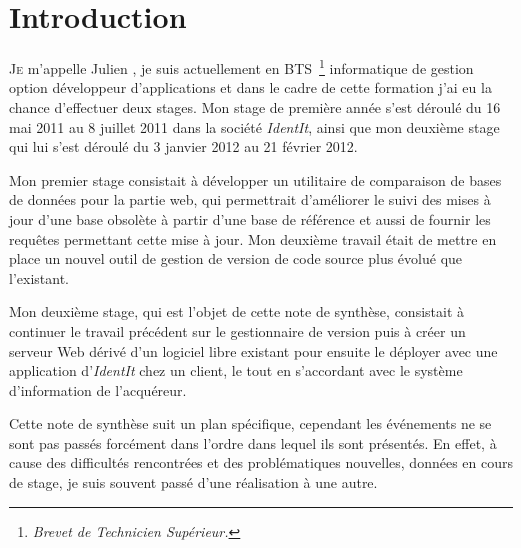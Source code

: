 \chapter{Introduction} %
\label{cha:Introduction}

\lettrine{J}{e} m'appelle Julien , je suis actuellement en
BTS\, \footnote{\emph{Brevet de Technicien Supérieur.}} informatique de
gestion option développeur d'applications et dans le cadre de cette
formation j'ai eu la chance d'effectuer deux stages. Mon stage de
première année s'est déroulé du 16 mai 2011 au 8 juillet 2011 dans la
société \emph{IdentIt}, ainsi que mon deuxième stage qui lui s'est
déroulé du 3 janvier 2012 au 21 février 2012.

Mon premier stage consistait à développer un utilitaire de comparaison
de bases de données pour la partie web, qui permettrait d'améliorer le
suivi des mises à jour d'une base obsolète à partir d'une base de
référence et aussi de fournir les requêtes permettant cette mise à jour.
Mon deuxième travail était de mettre en place un nouvel outil de gestion
de version de code source plus évolué que l'existant.

Mon deuxième stage, qui est l'objet de cette note de synthèse,
consistait à continuer le travail précédent sur le gestionnaire de
version puis à créer un serveur Web dérivé d'un logiciel libre existant
pour ensuite le déployer avec une application d'\emph{IdentIt} chez un
client, le tout en s'accordant avec le système d'information de
l'acquéreur.

Cette note de synthèse suit un plan spécifique, cependant les événements
ne se sont pas passés forcément dans l'ordre dans lequel ils sont
présentés. En effet, à cause des difficultés rencontrées et des
problématiques nouvelles, données en cours de stage, je suis souvent
passé d'une réalisation à une autre.
